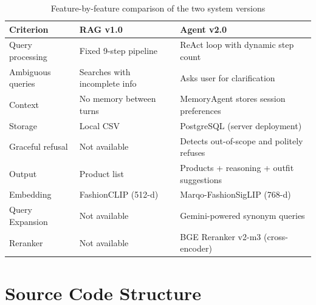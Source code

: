 \begin{table}[H]
\centering
\begin{tabular}{lll}
\toprule
\textbf{Criterion} & \textbf{RAG v1.0} & \textbf{Agent v2.0}\\
\midrule
Query processing  & Fixed 9-step pipeline & ReAct loop with dynamic step count\\
Ambiguous queries & Searches with incomplete info & Asks user for clarification\\
Context           & No memory between turns & MemoryAgent stores session preferences\\
Storage           & Local CSV & PostgreSQL (server deployment)\\
Graceful refusal  & Not available & Detects out-of-scope and politely refuses\\
Output            & Product list & Products + reasoning + outfit suggestions\\
Embedding         & FashionCLIP (512-d) & Marqo-FashionSigLIP (768-d)\\
Query Expansion   & Not available & Gemini-powered synonym queries\\
Reranker          & Not available & BGE Reranker v2-m3 (cross-encoder)\\
\bottomrule
\end{tabular}
\caption{Feature-by-feature comparison of the two system versions}
\end{table}

\section{Source Code Structure}


